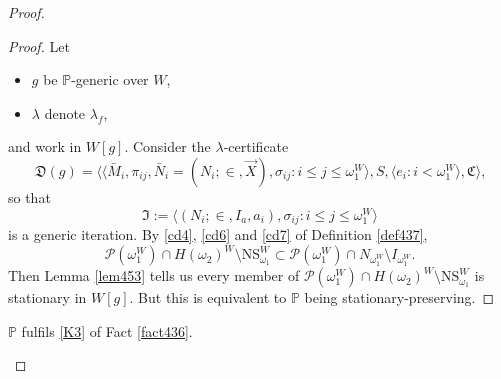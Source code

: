 \documentclass[12pt]{article}
\numberwithin{equation}{section}
\begin{document}
\begin{proof}
\begin{proof}
Let 
\begin{itemize}
    \item $g$ be $\mathbb{P}$-generic over $W$,
    \item $\lambda$ denote $\lambda_f$, 
\end{itemize} 
and work in $W[g]$. Consider the $\lambda$-certificate
\begin{equation*}
    \mathfrak{D}(g) = \langle \langle \bar{M}_i, \pi_{ij},  \bar{N}_i = (N_i; \in, \Vec{X}), \sigma_{ij} : i \leq j \leq \omega_1^{W} \rangle, S, \langle e_i : i < \omega_1^W \rangle, \mathfrak{C} \rangle \text{,}
\end{equation*}
so that 
\begin{equation*}
    \mathfrak{I} := \langle (N_i; \in, I_a, a_i), \sigma_{ij} : i \leq j \leq \omega_1^{W} \rangle
\end{equation*}
is a generic iteration. By \ref{cd4}, \ref{cd6} and \ref{cd7} of Definition \ref{def437}, 
\begin{equation*}
    \mathcal{P}(\omega_1^W) \cap H(\omega_2)^W \setminus \mathrm{NS}_{\omega_1}^W \subset \mathcal{P}(\omega_1^W) \cap N_{\omega_1^W} \setminus I_{\omega_1^W} \text{.}
\end{equation*}
Then Lemma \ref{lem453} tells us every member of $\mathcal{P}(\omega_1^W) \cap H(\omega_2)^W \setminus \mathrm{NS}_{\omega_1}^W$ is stationary in $W[g]$. But this is equivalent to $\mathbb{P}$ being stationary-preserving.
\end{proof}

\begin{lem}\label{lem455}
$\mathbb{P}$ fulfils \ref{K3} of Fact \ref{fact436}.
\end{lem}


\end{proof}
\end{document}
